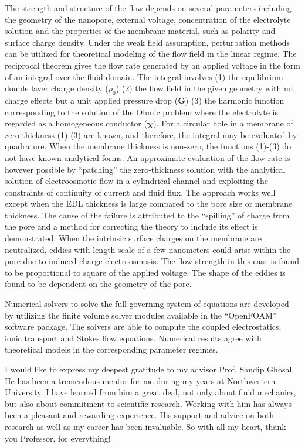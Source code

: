 \documentclass[12pt]{nuthesis}	%
\begin{document}
The strength and structure of the flow depends on several parameters including the geometry of the nanopore, external voltage, concentration of the electrolyte solution and the properties of the membrane material, such as polarity and surface charge density. Under the weak field assumption, perturbation methods can be utilized for theoretical modeling of the flow field in the linear regime. The reciprocal theorem gives the flow rate generated by an applied voltage in the form of an integral over the fluid domain. The integral involves (1) the equilibrium double layer charge density ($\rho_{0}$)  (2) the flow field in the given geometry with no charge effects but a unit applied pressure drop ($\mathbf{G}$) (3) the harmonic function corresponding to the solution of the Ohmic problem where the electrolyte is regarded as a homogeneous conductor ($\mathbf{\chi}$).  For a circular hole in a membrane of zero thickness (1)-(3) are known, and therefore, the integral may be evaluated by quadrature. When the membrane thickness is non-zero, the functions (1)-(3) do not have known analytical forms. An approximate evaluation of the flow rate is however possible by ``patching'' the zero-thickness solution with the analytical solution of electroosmotic flow in a cylindrical channel and exploiting the constraints of continuity of current and fluid flux. The approach works well except when the EDL thickness is large compared to the pore size or membrane thickness. The cause of the failure is attributed to the ``spilling'' of charge from the pore and a method for correcting the theory to include its effect is demonstrated. When the intrinsic surface charges on the membrane are neutralized, eddies with length scale of a few nanometers could arise within the pore due to induced charge electroosmosis. The flow strength in this case is found to be proportional to square of the applied voltage. The shape of the eddies is found to be dependent on the geometry of the pore.

Numerical solvers to solve the full governing system of equations are developed by utilizing the finite volume solver
modules available in the ``OpenFOAM'' software package. The solvers are able to compute the coupled electrostatics, ionic transport and Stokes flow equations. Numerical results agree with theoretical models in the corresponding parameter regimes.

\acknowledgements	%

I would like to express my deepest gratitude to my advisor Prof. Sandip Ghosal. He has been a tremendous mentor for me during my years at Northwestern University. I have learned from him a great deal, not only about fluid mechanics, but also about commitment to scientific research. Working with him has always been a pleasant and rewarding experience. His support and advice on both research as well as my career has been invaluable. So with all my heart, thank you Professor, for everything!
\end{document}
